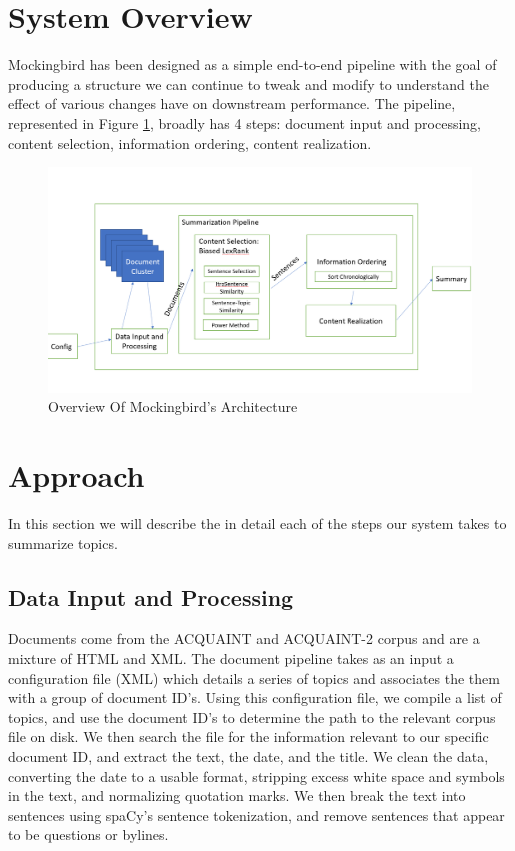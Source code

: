 \documentclass[11pt,a4paper]{article}
\begin{document}
\section{System Overview}
Mockingbird has been designed as a simple end-to-end pipeline with the goal of producing a structure we can continue to tweak and modify to understand the effect of various changes have on downstream performance. The pipeline, represented in Figure \ref{fig:overview}, broadly has 4 steps: document input and processing, content selection, information ordering, content realization.
\begin{figure}[h]
  \includegraphics[width=\linewidth]{doc/overview.png}
  \caption{Overview Of Mockingbird's Architecture}
  \label{fig:overview}
\end{figure}
\section{Approach}
In this section we will describe the in detail each of the steps our system takes to summarize topics.
\subsection{Data Input and Processing}
Documents come from the ACQUAINT and ACQUAINT-2 corpus and are a mixture of HTML and XML. The document pipeline takes as an input a configuration file (XML) which details a series of topics and associates the them with a group of document ID's. Using this configuration file, we compile a list of topics, and use the document ID's to determine the path to the relevant corpus file on disk. We then search the file for the information relevant to our specific document ID, and extract the text, the date, and the title. We clean the data, converting the date to a usable format, stripping excess white space and symbols in the text, and normalizing quotation marks. We then break the text into sentences using spaCy's sentence tokenization, and remove sentences that appear to be questions or bylines.
\end{document}
